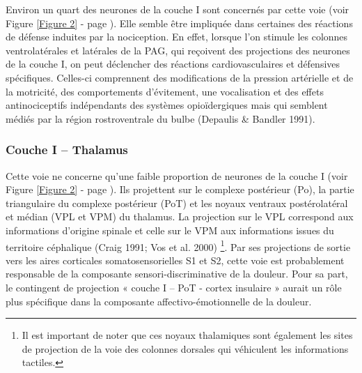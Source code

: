\documentclass[a4paper,12pt,twoside]{report}
\begin{document}
Environ un quart des neurones de la couche I sont concernés par cette voie (voir Figure \ref{Figure 2} - page \pageref{Figure 2}). Elle semble être impliquée dans certaines des réactions de défense induites par la nociception. En effet, lorsque l’on stimule les colonnes ventrolatérales et latérales de la PAG, qui reçoivent des projections des neurones de la couche I, on peut déclencher des réactions cardiovasculaires et défensives spécifiques. Celles-ci comprennent des modifications de la pression artérielle et de la motricité, des comportements d’évitement, une vocalisation et des effets antinociceptifs indépendants des systèmes opioïdergiques mais qui semblent médiés par la région rostroventrale du bulbe (Depaulis \& Bandler 1991).

\subsubsection{Couche I – Thalamus}

Cette voie ne concerne qu’une faible proportion de neurones de la couche I (voir Figure \ref{Figure 2} - page \pageref{Figure 2}). Ils projettent sur le complexe postérieur (Po), la partie triangulaire du complexe postérieur (PoT) et les noyaux ventraux postérolatéral et médian (VPL et VPM) du thalamus. La projection sur le VPL correspond aux informations d'origine spinale et celle sur le VPM aux informations issues du territoire céphalique (Craig 1991; Vos et al. 2000)
\footnote{Il est important de noter que ces noyaux thalamiques sont également les sites de projection de la voie des colonnes dorsales qui véhiculent les informations tactiles.}. 
Par ses projections de sortie vers les aires corticales somatosensorielles S1 et S2, cette voie est probablement responsable de la composante sensori-discriminative de la douleur. Pour sa part, le contingent de projection « couche I – PoT - cortex insulaire » aurait un rôle plus spécifique dans la composante affectivo-émotionnelle de la douleur.
\end{document}
